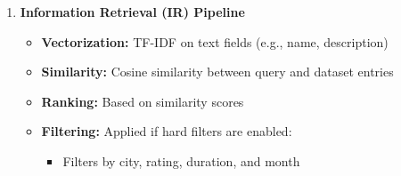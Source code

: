 \documentclass[12pt,a4paper]{article}
\begin{document}
\begin{enumerate}
\begin{enumerate}
\begin{enumerate}
            \item \textbf{Results Page}
            \begin{itemize}
                \item Shows top N results ranked by:
                \begin{itemize}
                    \item IR-only (TF-IDF + Cosine Similarity)
                    \item ML re-ranking (predicted rating)
                \end{itemize}
                \item Each result includes:
                \begin{itemize}
                    \item Place Name, City, Rating, IR Score, ML Score
                    \item Best Time to Visit, Duration, View Details button
                \end{itemize}
                \item Displays evaluation metrics for IR vs IR+ML
            \end{itemize}

            \item \textbf{Details Page}
            \begin{itemize}
                \item Displays:
                \begin{itemize}
                    \item Rating, Best Time, Duration, Distance from City
                    \item 5 Images (via Google Search)
                    \item City and Place Descriptions
                    \item Back to Results link
                \end{itemize}
            \end{itemize}
        \end{enumerate}
    \end{enumerate}

    \item \textbf{Information Retrieval (IR) Pipeline}
    \begin{itemize}
        \item \textbf{Vectorization:} TF-IDF on text fields (e.g., name, description)
        \item \textbf{Similarity:} Cosine similarity between query and dataset entries
        \item \textbf{Ranking:} Based on similarity scores
        \item \textbf{Filtering:} Applied if hard filters are enabled:
        \begin{itemize}
            \item Filters by city, rating, duration, and month
        \end{itemize}
    \end{itemize}


\end{enumerate}
\end{document}
